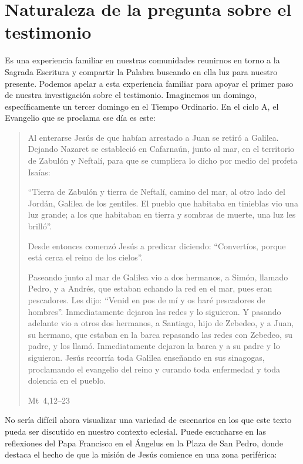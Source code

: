 \section{Naturaleza de la pregunta sobre el testimonio}
Es una experiencia familiar en nuestras comunidades reunirnos en torno a la
Sagrada Escritura y compartir la Palabra buscando en ella luz para nuestro
presente. Podemos apelar a esta experiencia familiar para apoyar el primer paso
de nuestra investigación sobre el testimonio. Imaginemos un domingo,
específicamente un tercer domingo en el Tiempo Ordinario. En el ciclo A, el
Evangelio que se proclama ese día es este:
\blockquote[Mt~4,12--23]{Al enterarse Jesús de que habían arrestado a Juan se
  retiró a Galilea. Dejando Nazaret se estableció en Cafarnaún, junto al mar, en
  el territorio de Zabulón y Neftalí, para que se cumpliera lo dicho por medio
  del profeta Isaías:

  \enquote{Tierra de Zabulón y tierra de Neftalí, camino del mar, al otro lado
    del Jordán, Galilea de los gentiles. El pueblo que habitaba en tinieblas vio
    una luz grande; a los que habitaban en tierra y sombras de muerte, una luz
    les brilló}.

  Desde entonces comenzó Jesús a predicar diciendo: \enquote{Convertíos, porque
    está cerca el reino de los cielos}.

  Paseando junto al mar de Galilea vio a dos hermanos, a Simón, llamado Pedro, y
  a Andrés, que estaban echando la red en el mar, pues eran pescadores. Les
  dijo: \enquote{Venid en pos de mí y os haré pescadores de hombres}.
  Inmediatamente dejaron las redes y lo siguieron. Y pasando adelante vio a
  otros dos hermanos, a Santiago, hijo de Zebedeo, y a Juan, su hermano, que
  estaban en la barca repasando las redes con Zebedeo, su padre, y los llamó.
  Inmediatamente dejaron la barca y a su padre y lo siguieron. Jesús recorría
  toda Galilea enseñando en sus sinagogas, proclamando el evangelio del reino y
  curando toda enfermedad y toda dolencia en el pueblo.}

No sería difícil ahora visualizar una variedad de escenarios en los que este
texto pueda ser discutido en nuestro contexto eclesial. Puede escucharse en las
reflexiones del Papa Francisco en el Ángelus en la Plaza de San Pedro, donde
destaca el hecho de que la misión de Jesús comience en una zona periférica:

